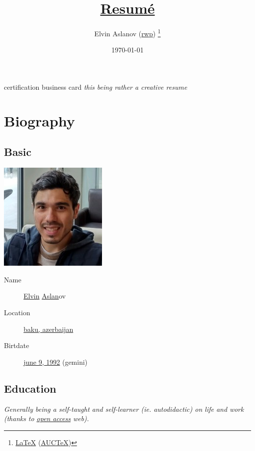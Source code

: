 \documentclass {article}
\title {\href{https://github.com/rwp0/resume}{Resumé}}
\author {Elvin Aslanov (\href{https://rwp0.github.io/}{rwp}) \thanks{\href{https://en.wikipedia.org/wiki/LaTeX}{\LaTeX} (\href{https://www.gnu.org/software/auctex/}{AUCTeX})}}
\date {\today}
\begin{document}
  \begin {titlepage}
    \maketitle
  \end {titlepage}
   {certification}
   {business card}
  \textit {this being rather a creative resume}

  \section {Biography}

    \subsection {Basic}
    \includegraphics [scale = 0.5] {resume.jpg}
      \begin {description}
      \item [Name] \href{https://en.wiktionary.org/wiki/Elvin}{Elvin} \href{https://en.wiktionary.org/wiki/Aslan}{Aslan}ov
        \item [Location] \href{https://www.openstreetmap.org/relation/2415335}{baku, azerbaijan}
        \item [Birtdate] \href{https://www.timeanddate.com/date/durationresult.html?m1=06&d1=09&y1=1992}{june 9, 1992} (gemini)
      \end {description}

    \subsection {Education}
      \textit {Generally being a self-taught and self-learner (ie. autodidactic) on life and work (thanks to \href{https://en.wikipedia.org/wiki/Open_access}{open access} web).}
\end{document}
